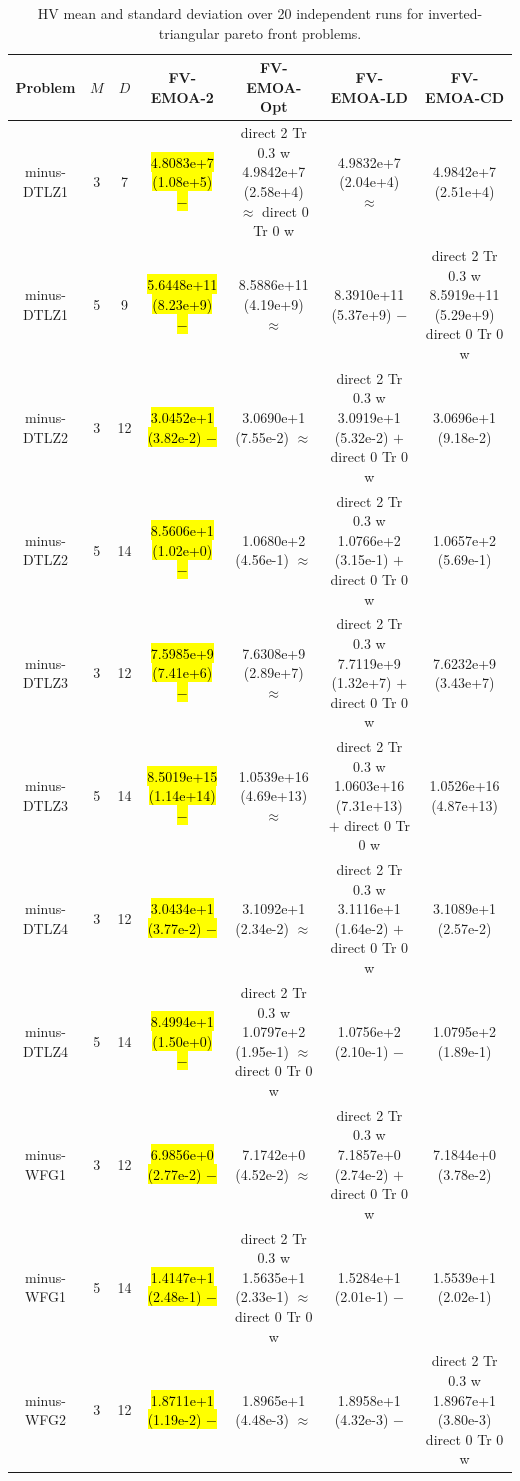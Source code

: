 \documentclass[conference]{IEEEtran}
\newcommand{\semitextbf}[1]{%
	\pdfliteral direct {2 Tr 0.3 w} %
	#1%
	\pdfliteral direct {0 Tr 0 w}%
}
\begin{document}
\begin{table}[!t]\footnotesize
    \caption{HV mean and standard deviation over 20 independent runs for inverted-triangular pareto front problems.} %
    \label{table_FVEMOA_itri}
    \centering
    \begin{tabular}{ccccccc}
        \toprule
        Problem&$M$&$D$&FV-EMOA-2&FV-EMOA-Opt&FV-EMOA-LD&FV-EMOA-CD\\ 
        \midrule
        \multirow{1}{*}{minus-DTLZ1}&3&7&\hl{4.8083e+7 (1.08e+5) $-$}&\semitextbf{4.9842e+7 (2.58e+4) $\approx$}&4.9832e+7 (2.04e+4) $\approx$&4.9842e+7 (2.51e+4)\\
        \multirow{1}{*}{minus-DTLZ1}&5&9&\hl{5.6448e+11 (8.23e+9) $-$}&8.5886e+11 (4.19e+9) $\approx$&8.3910e+11 (5.37e+9) $-$&\semitextbf{8.5919e+11 (5.29e+9)}\\
        \multirow{1}{*}{minus-DTLZ2}&3&12&\hl{3.0452e+1 (3.82e-2) $-$}&3.0690e+1 (7.55e-2) $\approx$&\semitextbf{3.0919e+1 (5.32e-2) $+$}&3.0696e+1 (9.18e-2)\\
        \multirow{1}{*}{minus-DTLZ2}&5&14&\hl{8.5606e+1 (1.02e+0) $-$}&1.0680e+2 (4.56e-1) $\approx$&\semitextbf{1.0766e+2 (3.15e-1) $+$}&1.0657e+2 (5.69e-1)\\
        \multirow{1}{*}{minus-DTLZ3}&3&12&\hl{7.5985e+9 (7.41e+6) $-$}&7.6308e+9 (2.89e+7) $\approx$&\semitextbf{7.7119e+9 (1.32e+7) $+$}&7.6232e+9 (3.43e+7)\\
        \multirow{1}{*}{minus-DTLZ3}&5&14&\hl{8.5019e+15 (1.14e+14) $-$}&1.0539e+16 (4.69e+13) $\approx$&\semitextbf{1.0603e+16 (7.31e+13) $+$}&1.0526e+16 (4.87e+13)\\
        \multirow{1}{*}{minus-DTLZ4}&3&12&\hl{3.0434e+1 (3.77e-2) $-$}&3.1092e+1 (2.34e-2) $\approx$&\semitextbf{3.1116e+1 (1.64e-2) $+$}&3.1089e+1 (2.57e-2)\\
        \multirow{1}{*}{minus-DTLZ4}&5&14&\hl{8.4994e+1 (1.50e+0) $-$}&\semitextbf{1.0797e+2 (1.95e-1) $\approx$}&1.0756e+2 (2.10e-1) $-$&1.0795e+2 (1.89e-1)\\      
        \hline
        \multirow{1}{*}{minus-WFG1}&3&12&\hl{6.9856e+0 (2.77e-2) $-$}&7.1742e+0 (4.52e-2) $\approx$&\semitextbf{7.1857e+0 (2.74e-2) $+$}&7.1844e+0 (3.78e-2)\\
        \multirow{1}{*}{minus-WFG1}&5&14&\hl{1.4147e+1 (2.48e-1) $-$}&\semitextbf{1.5635e+1 (2.33e-1) $\approx$}&1.5284e+1 (2.01e-1) $-$&1.5539e+1 (2.02e-1)\\
        \multirow{1}{*}{minus-WFG2}&3&12&\hl{1.8711e+1 (1.19e-2) $-$}&1.8965e+1 (4.48e-3) $\approx$&1.8958e+1 (4.32e-3) $-$&\semitextbf{1.8967e+1 (3.80e-3)}\\

\end{tabular}
\end{table}
\end{document}
